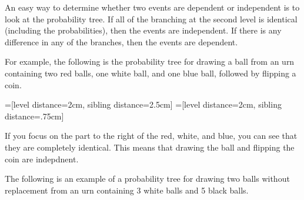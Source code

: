 \documentclass{ximera}
\begin{document}
An easy way to determine whether two events are dependent or independent is to look at the probability tree. If all of the branching at the second level is identical (including the probabilities), then the events are independent. If there is any difference in any of the branches, then the events are dependent.

For example, the following is the probability tree for drawing a ball from an urn containing two red balls, one white ball, and one blue ball, followed by flipping a coin.

\begin{center}

=[level distance=2cm, sibling distance=2.5cm]
=[level distance=2cm, sibling distance=.75cm]

\end{center}

If you focus on the part to the right of the red, white, and blue, you can see that they are completely identical. This means that drawing the ball and flipping the coin are indepdnent.

The following is an example of a probability tree for drawing two balls without replacement from an urn containing 3 white balls and 5 black balls.
\end{document}

